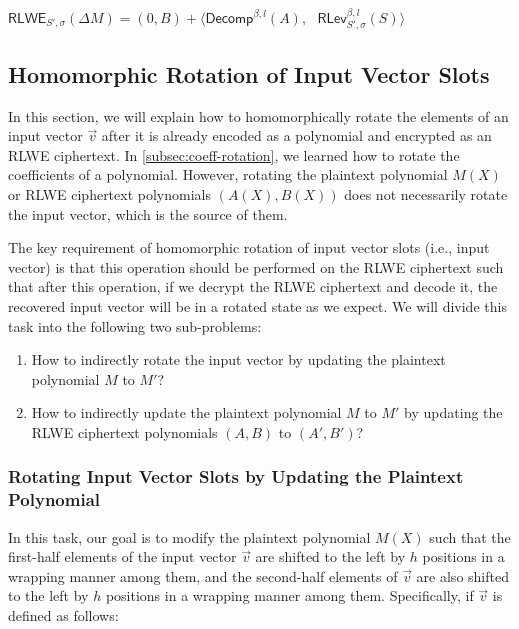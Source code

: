 \begin{tcolorbox}[title={\textbf{\tboxlabel{\ref*{subsec:bfv-key-switching}} BFV's Key Switching}}]
$\textsf{RLWE}_{S',\sigma}(\Delta M) = (0, B) + \bm{\langle} \textsf{Decomp}^{\beta, l}(A), \text{ } \textsf{RLev}_{S', \sigma}^{\beta, l}(S) \bm{\rangle}$
\end{tcolorbox}




\subsection{Homomorphic Rotation of Input Vector Slots}
\label{subsec:bfv-rotation}


In this section, we will explain how to homomorphically rotate the elements of an input vector $\vec{v}$ after it is already encoded as a polynomial and encrypted as an RLWE ciphertext. In \autoref{subsec:coeff-rotation}, we learned how to rotate the coefficients of a polynomial. However, rotating the plaintext polynomial $M(X)$ or RLWE ciphertext polynomials $(A(X), B(X))$ does not necessarily rotate the input vector, which is the source of them. 

The key requirement of homomorphic rotation of input vector slots (i.e., input vector) is that this operation should be performed on the RLWE ciphertext such that after this operation, if we decrypt the RLWE ciphertext and decode it, the recovered input vector will be in a rotated state as we expect. We will divide this task into the following two sub-problems:

\begin{enumerate}[leftmargin=3\parindent]
\item How to indirectly rotate the input vector by updating the plaintext polynomial $M$ to $M'$?

\item How to indirectly update the plaintext polynomial $M$ to $M'$ by updating the RLWE ciphertext polynomials $(A, B)$ to $(A', B')$?
\end{enumerate}



\subsubsection{Rotating Input Vector Slots by Updating the Plaintext Polynomial}

In this task, our goal is to modify the plaintext polynomial $M(X)$ such that the first-half elements of the input vector $\vec{v}$ are shifted to the left by $h$ positions in a wrapping manner among them, and the second-half elements of $\vec{v}$ are also shifted to the left by $h$ positions in a wrapping manner among them. Specifically, if $\vec{v}$ is defined as follows:

